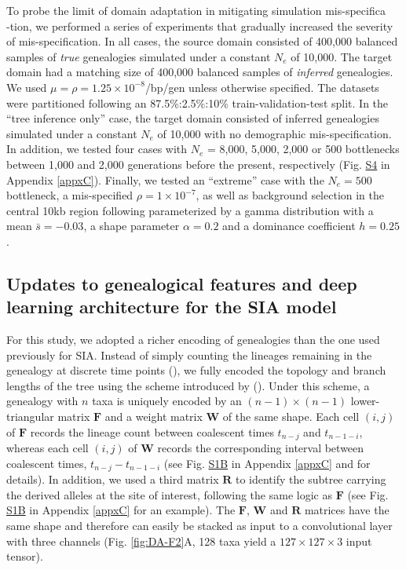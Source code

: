 To probe the limit of domain adaptation in mitigating simulation mis-specifica\\-tion, we performed a series of experiments that gradually increased the severity of mis-specification. In all cases, the source domain consisted of 400,000 balanced samples of \textit{true} genealogies simulated under a constant $N_e$ of 10,000. The target domain had a matching size of 400,000 balanced samples of \textit{inferred} genealogies. We used $\mu = \rho = 1.25\times 10^{-8}$/bp/gen unless otherwise specified. The datasets were partitioned following an 87.5\%:2.5\%:10\% train-validation-test split. In the “tree inference only” case, the target domain consisted of inferred genealogies simulated under a constant $N_e$ of 10,000 with no demographic mis-specification. In addition, we tested four cases with $N_e$ = 8,000, 5,000, 2,000 or 500 bottlenecks between 1,000 and 2,000 generations before the present, respectively (Fig. \href{https://journals.plos.org/plosgenetics/article?id=10.1371/journal.pgen.1011032#sec018}{S4} in Appendix \ref{appxC}). Finally, we tested an “extreme” case with the $N_e = 500$ bottleneck, a mis-specified $\rho = 1\times 10^{-7}$, as well as background selection in the central 10kb region following  parameterized by a gamma distribution with a mean $\bar{s}=-0.03$, a shape parameter $\alpha = 0.2$ and a dominance coefficient $h = 0.25$.

\subsection{Updates to genealogical features and deep learning architecture for the \ac{SIA} model}

For this study, we adopted a richer encoding of genealogies than the one used previously for \ac{SIA}. Instead of simply counting the lineages remaining in the genealogy at discrete time points (\cite{hejase_deep-learning_2022}), we fully encoded the topology and branch lengths of the tree using the scheme introduced by (\cite{kim_distance_2020}). Under this scheme, a genealogy with $n$ taxa is uniquely encoded by an $(n-1) \times (n-1)$ lower-triangular matrix $\mathbf{F}$ and a weight matrix $\mathbf{W}$ of the same shape. Each cell $(i, j)$ of $\mathbf{F}$ records the lineage count between coalescent times $t_{n-j}$ and $t_{n-1-i}$, whereas each cell $(i, j)$ of $\mathbf{W}$ records the corresponding interval between coalescent times, $t_{n-j}-t_{n-1-i}$ (see Fig. \href{https://journals.plos.org/plosgenetics/article?id=10.1371/journal.pgen.1011032#sec018}{S1B} in Appendix \ref{appxC} and \cite{kim_distance_2020} for details). In addition, we used a third matrix $\mathbf{R}$ to identify the subtree carrying the derived alleles at the site of interest, following the same logic as $\mathbf{F}$ (see Fig. \href{https://journals.plos.org/plosgenetics/article?id=10.1371/journal.pgen.1011032#sec018}{S1B} in Appendix \ref{appxC} for an example). The $\mathbf{F}$, $\mathbf{W}$ and $\mathbf{R}$ matrices have the same shape and therefore can easily be stacked as input to a convolutional layer with three channels (Fig. \ref{fig:DA-F2}A, 128 taxa yield a $127 \times 127 \times 3$ input tensor).

